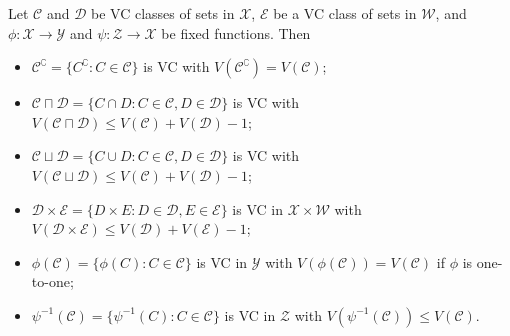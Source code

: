 \documentclass[12pt, a3paper, openany]{book}
\begin{document}
\begin{Lemma}
Let $\mathcal{C}$ and $\mathcal{D}$ be VC classes of sets in $\mathcal{X}$, $\mathcal{E}$ be a VC class of sets in $\mathcal{W}$, and $\phi : \mathcal{X} \to \mathcal{Y}$ and $\psi : \mathcal{Z} \to \mathcal{X}$ be fixed functions. Then
\begin{itemize}
\setlength{\itemsep}{0pt}
\item $\mathcal{C}^{\complement} = \{ C^{\complement} : C \in \mathcal{C} \}$ is VC with $V(\mathcal{C}^{\complement}) = V(\mathcal{C})$;
\item $\mathcal{C} \sqcap \mathcal{D} = \{ C \cap D : C \in \mathcal{C}, D \in \mathcal{D} \}$ is VC with $V(\mathcal{C} \sqcap \mathcal{D}) \leq V(\mathcal{C}) + V(\mathcal{D}) - 1$;
\item $\mathcal{C} \sqcup \mathcal{D} = \{ C \cup D : C \in \mathcal{C}, D \in \mathcal{D} \}$ is VC with $V(\mathcal{C} \sqcup \mathcal{D}) \leq V(\mathcal{C}) + V(\mathcal{D}) - 1$;
\item $\mathcal{D} \times \mathcal{E} = \{ D \times E : D \in \mathcal{D}, E \in \mathcal{E} \}$ is VC in $\mathcal{X} \times \mathcal{W}$ with $V(\mathcal{D} \times \mathcal{E}) \leq V(\mathcal{D}) + V(\mathcal{E}) - 1$;
\item $\phi(\mathcal{C}) = \{ \phi(C) : C \in \mathcal{C} \}$ is VC in $\mathcal{Y}$ with $V(\phi(\mathcal{C})) = V(\mathcal{C})$ if $\phi$ is one-to-one;
\item $\psi^{-1}(\mathcal{C}) = \{ \psi^{-1}(C) : C \in \mathcal{C} \}$ is VC in $\mathcal{Z}$ with $V(\psi^{-1}(\mathcal{C})) \leq V(\mathcal{C})$.
\end{itemize}
\end{Lemma}
\end{document}
